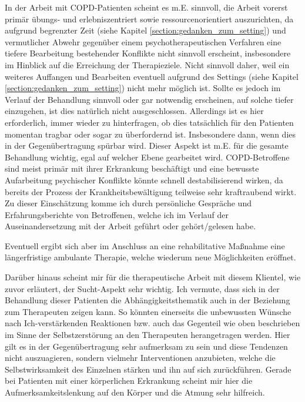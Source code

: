 In der Arbeit mit COPD-Patienten scheint es m.E. sinnvoll, die Arbeit vorerst primär übungs- und erlebniszentriert sowie ressourcenorientiert auszurichten, da aufgrund begrenzter Zeit (siehe Kapitel \ref{section:gedanken_zum_setting}) und vermutlicher Abwehr gegenüber einem psychotherapeutischen Verfahren eine tiefere Bearbeitung bestehender Konflikte nicht sinnvoll erscheint, insbesondere im Hinblick auf die Erreichung der Therapieziele. Nicht sinnvoll daher, weil ein weiteres Auffangen und Bearbeiten eventuell aufgrund des Settings (siehe Kapitel \ref{section:gedanken_zum_setting}) nicht mehr möglich ist. Sollte es jedoch im Verlauf der Behandlung sinnvoll oder gar notwendig erscheinen, auf solche tiefer einzugehen, ist dies natürlich nicht ausgeschlossen. Allerdings ist es hier erforderlich, immer wieder zu hinterfragen, ob dies tatsächlich für den Patienten momentan tragbar oder sogar zu überfordernd ist. Insbesondere dann, wenn dies in der Gegenübertragung spürbar wird. Dieser Aspekt ist m.E. für die gesamte Behandlung wichtig, egal auf welcher Ebene gearbeitet wird. COPD-Betroffene sind meist primär mit ihrer Erkrankung beschäftigt und eine bewusste Aufarbeitung psychischer Konflikte könnte schnell destabilisierend wirken, da bereits der Prozess der Krankheitsbewältigung teilweise sehr kraftraubend wirkt. Zu dieser Einschätzung komme ich durch persönliche Gespräche und Erfahrungsberichte von Betroffenen, welche ich im Verlauf der Auseinandersetzung mit der Arbeit geführt oder gehört/gelesen habe. 

Eventuell ergibt sich aber im Anschluss an eine rehabilitative Maßnahme eine längerfristige ambulante Therapie, welche wiederum neue Möglichkeiten eröffnet. 

Darüber hinaus scheint mir für die therapeutische Arbeit mit diesem Klientel, wie zuvor erläutert, der Sucht-Aspekt sehr wichtig. Ich vermute, dass sich in der Behandlung dieser Patienten die Abhängigkeitsthematik auch in der Beziehung zum Therapeuten zeigen kann. So könnten einerseits die unbewussten Wünsche nach Ich-verstärkenden Reaktionen bzw. auch das Gegenteil wie oben beschrieben im Sinne der Selbstzerstörung an den Therapeuten herangetragen werden. Hier gilt es in der Gegenübertragung sehr aufmerksam zu sein und diese Tendenzen nicht auszuagieren, sondern vielmehr Interventionen anzubieten, welche die Selbstwirksamkeit des Einzelnen stärken und ihn auf sich zurückführen. Gerade bei Patienten mit einer körperlichen Erkrankung scheint mir hier die Aufmerksamkeitslenkung auf den Körper und die Atmung sehr hilfreich. 

